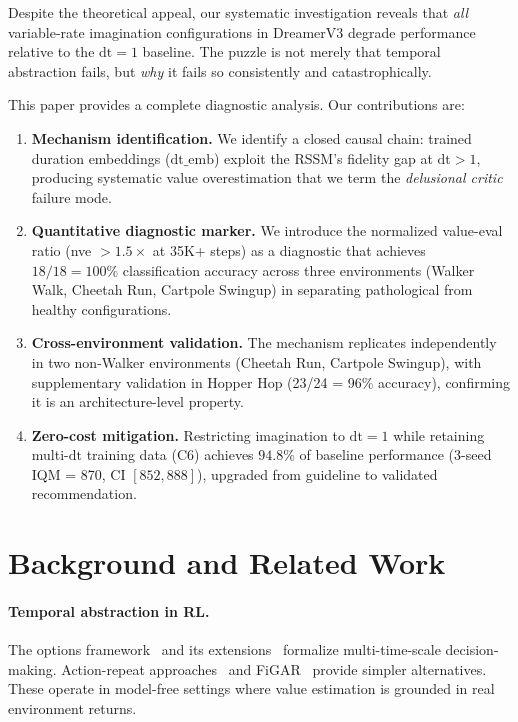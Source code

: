 \documentclass[10pt,letterpaper]{article}
\newcommand{\dt}{\mathrm{dt}}
\begin{document}
Despite the theoretical appeal, our systematic investigation reveals that \emph{all} variable-rate imagination configurations in DreamerV3 degrade performance relative to the $\dt=1$ baseline.
The puzzle is not merely that temporal abstraction fails, but \emph{why} it fails so consistently and catastrophically.

This paper provides a complete diagnostic analysis.
Our contributions are:
\begin{enumerate}
    \item \textbf{Mechanism identification.} We identify a closed causal chain: trained duration embeddings ($\dt\_\text{emb}$) exploit the RSSM's fidelity gap at $\dt > 1$, producing systematic value overestimation that we term the \emph{delusional critic} failure mode.
    \item \textbf{Quantitative diagnostic marker.} We introduce the normalized value-eval ratio (nve $> 1.5\times$ at 35K+ steps) as a diagnostic that achieves $18/18 = 100\%$ classification accuracy across three environments (Walker Walk, Cheetah Run, Cartpole Swingup) in separating pathological from healthy configurations.
    \item \textbf{Cross-environment validation.} The mechanism replicates independently in two non-Walker environments (Cheetah Run, Cartpole Swingup), with supplementary validation in Hopper Hop (23/24 = 96\% accuracy), confirming it is an architecture-level property.
    \item \textbf{Zero-cost mitigation.} Restricting imagination to $\dt=1$ while retaining multi-$\dt$ training data (C6) achieves $94.8\%$ of baseline performance (3-seed IQM = 870, CI $[852, 888]$), upgraded from guideline to validated recommendation.
\end{enumerate}

\section{Background and Related Work}

\paragraph{Temporal abstraction in RL.}
The options framework~\citep{sutton1999between,precup2000temporal} and its extensions~\citep{bacon2017option} formalize multi-time-scale decision-making.
Action-repeat approaches~\citep{lakshminarayanan2017dynamic,sharma2017learning} and FiGAR~\citep{braylan2015frame} provide simpler alternatives.
These operate in model-free settings where value estimation is grounded in real environment returns.
\end{document}
